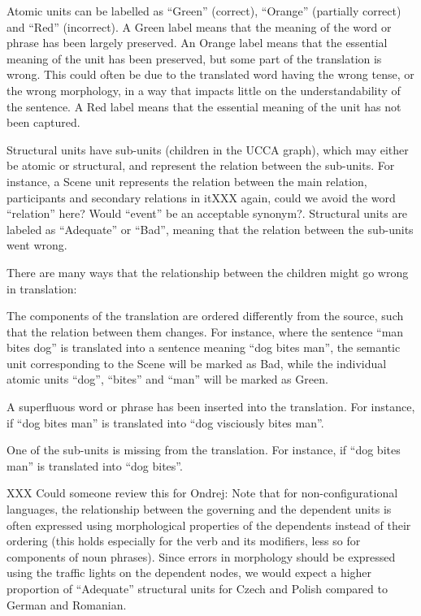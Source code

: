 \documentclass[11pt]{article}
\newcommand{\XXX}[1]{{\color{red}XXX #1}} %
\begin{document}
Atomic units can be labelled as ``Green'' (correct), ``Orange'' (partially correct)
and ``Red'' (incorrect). 
A Green label means that the meaning of the word or phrase has been largely preserved.
An Orange label means that the essential meaning of the unit has been preserved,
but some part of the translation is wrong.
This could often be due to the translated word having the wrong tense,
or the wrong morphology, in a way that impacts little on the understandability of the sentence.
A Red label means that the essential meaning of the unit has not been captured.

Structural units have sub-units (children in the UCCA graph), which may either be
atomic or structural, and represent the relation between the sub-units.
For instance, a Scene unit 
represents the relation between the main relation, participants and secondary
relations in it\XXX{again, could we avoid the word ``relation'' here? Would
``event'' be an acceptable synonym?}. Structural units are labeled as ``Adequate'' or ``Bad'', meaning
that the relation between the sub-units went wrong.

There are many ways that the relationship between the children might go
wrong in translation:

\begin{compactitem}
\item The components of the translation are ordered differently from the source,
  such that the relation between them changes. For instance, where
  the sentence ``man bites dog'' is translated into a sentence meaning ``dog bites man'',
  the semantic unit corresponding to the Scene will be marked as Bad, while
  the individual atomic units ``dog'', ``bites'' and ``man'' will be marked as Green.
\item A superfluous word or phrase has been inserted into
  the translation. For instance, if ``dog bites man'' is translated into ``dog visciously bites man''.
\item One of the sub-units is missing from the translation. For instance, if ``dog bites man'' is translated into ``dog bites''.
\end{compactitem}

\XXX{Could someone review this for Ondrej:}
Note that for non-configurational languages, the relationship between the
governing and the dependent units is often expressed using morphological
properties of the dependents instead of their ordering (this holds especially for the verb and its
modifiers, less so for components of noun phrases). Since errors in morphology
should be expressed using the traffic lights on the dependent nodes, we would expect
a higher proportion of ``Adequate'' structural units for Czech and Polish
compared to German and Romanian.
\end{document}

